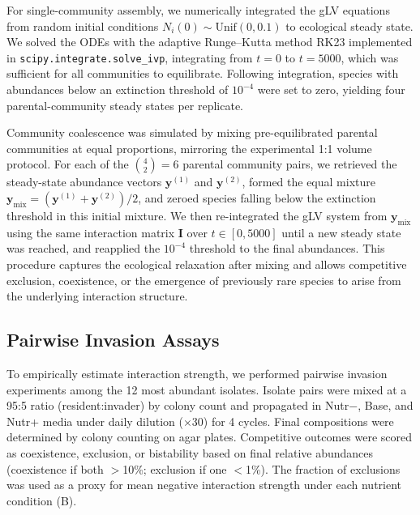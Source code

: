 For single-community assembly, we numerically integrated the gLV equations from random initial conditions $N_i(0) \sim \text{Unif}(0, 0.1)$ to ecological steady state. We solved the ODEs with the adaptive Runge--Kutta method RK23 implemented in \texttt{scipy.integrate.solve\_ivp}, integrating from $t = 0$ to $t = 5000$, which was sufficient for all communities to equilibrate. Following integration, species with abundances below an extinction threshold of $10^{-4}$ were set to zero, yielding four parental-community steady states per replicate.

Community coalescence was simulated by mixing pre-equilibrated parental communities at equal proportions, mirroring the experimental 1:1 volume protocol. For each of the $\binom{4}{2} = 6$ parental community pairs, we retrieved the steady-state abundance vectors $\mathbf{y}^{(1)}$ and $\mathbf{y}^{(2)}$, formed the equal mixture $\mathbf{y}_{\text{mix}} = (\mathbf{y}^{(1)} + \mathbf{y}^{(2)})/2$, and zeroed species falling below the extinction threshold in this initial mixture. We then re-integrated the gLV system from $\mathbf{y}_{\text{mix}}$ using the same interaction matrix $\mathbf{I}$ over $t \in [0, 5000]$ until a new steady state was reached, and reapplied the $10^{-4}$ threshold to the final abundances. This procedure captures the ecological relaxation after mixing and allows competitive exclusion, coexistence, or the emergence of previously rare species to arise from the underlying interaction structure.


\subsection*{Pairwise Invasion Assays}
\label{sec:methods:invasion}

To empirically estimate interaction strength, we performed pairwise invasion experiments among the 12 most abundant isolates. Isolate pairs were mixed at a 95:5 ratio (resident:invader) by colony count and propagated in Nutr$-$, Base, and Nutr+ media under daily dilution ($\times$30) for 4 cycles. Final compositions were determined by colony counting on agar plates. Competitive outcomes were scored as coexistence, exclusion, or bistability based on final relative abundances (coexistence if both $>$10\%; exclusion if one $<$1\%). The fraction of exclusions was used as a proxy for mean negative interaction strength under each nutrient condition (B).


